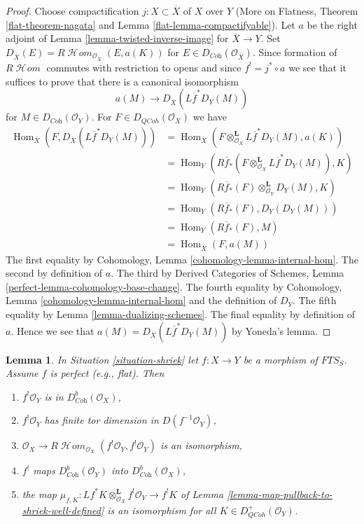 \documentclass{stacks-project}
\theoremstyle{plain}
\newtheorem{lemma}[subsection]{Lemma}
\theoremstyle{definition}
\theoremstyle{remark}
\numberwithin{equation}{subsection}
\def\Hom{\mathop{\mathrm{Hom}}\nolimits}
\def\SheafHom{\mathop{\mathcal{H}\!\mathit{om}}\nolimits}
\def\QCoh{\mathit{QCoh}}
\begin{document}
\begin{proof}
Choose compactification $j : X \subset \overline{X}$ of $X$ over $Y$
(More on Flatness, Theorem \ref{flat-theorem-nagata} and
Lemma \ref{flat-lemma-compactifyable}). Let $a$ be the
right adjoint of Lemma \ref{lemma-twisted-inverse-image} for
$\overline{X} \to Y$. Set
$D_{\overline{X}}(E) = R\SheafHom_{\mathcal{O}_{\overline{X}}}(E, a(K))$
for $E \in D_{\textit{Coh}}(\mathcal{O}_{\overline{X}})$.
Since formation of $R\SheafHom$ commutes with restriction to opens
and since $f^! = j^* \circ a$ we see that it suffices to prove that
there is a canonical isomorphism
$$
a(M) \longrightarrow D_{\overline{X}}(L\overline{f}^*D_Y(M))
$$
for $M \in D_{\textit{Coh}}(\mathcal{O}_Y)$. For
$F \in D_\QCoh(\mathcal{O}_X)$ we have
\begin{align*}
\Hom_{\overline{X}}(
F, D_{\overline{X}}(L\overline{f}^*D_Y(M)))
& =
\Hom_{\overline{X}}(
F \otimes_{\mathcal{O}_X}^\mathbf{L} L\overline{f}^*D_Y(M), a(K)) \\
& =
\Hom_Y(
R\overline{f}_*(F \otimes_{\mathcal{O}_X}^\mathbf{L} L\overline{f}^*D_Y(M)),
K) \\
& =
\Hom_Y(
R\overline{f}_*(F) \otimes_{\mathcal{O}_Y}^\mathbf{L} D_Y(M),
K) \\
& =
\Hom_Y(
R\overline{f}_*(F), D_Y(D_Y(M))) \\
& =
\Hom_Y(R\overline{f}_*(F), M) \\
& = \Hom_{\overline{X}}(F, a(M))
\end{align*}
The first equality by Cohomology, Lemma \ref{cohomology-lemma-internal-hom}.
The second by definition of $a$.
The third by Derived Categories of Schemes, Lemma
\ref{perfect-lemma-cohomology-base-change}.
The fourth equality by Cohomology, Lemma \ref{cohomology-lemma-internal-hom}
and the definition of $D_Y$.
The fifth equality by Lemma \ref{lemma-dualizing-schemes}.
The final equality by definition of $a$.
Hence we see that $a(M) = D_{\overline{X}}(L\overline{f}^*D_Y(M))$
by Yoneda's lemma.
\end{proof}

\begin{lemma}
\label{lemma-perfect-comparison-shriek}
In Situation \ref{situation-shriek} let $f : X \to Y$ be a morphism of
$\textit{FTS}_S$. Assume $f$ is perfect (e.g., flat). Then
\begin{enumerate}
\item[(a)] $f^!\mathcal{O}_Y$ is in $D_{\textit{Coh}}^b(\mathcal{O}_X)$,
\item[(b)] $f^!\mathcal{O}_Y$ has finite tor dimension in
$D(f^{-1}\mathcal{O}_Y)$,
\item[(c)] $\mathcal{O}_X \to
R\SheafHom_{\mathcal{O}_X}(f^!\mathcal{O}_Y, f^!\mathcal{O}_Y)$
is an isomorphism,
\item[(d)] $f^!$ maps $D_{\textit{Coh}}^b(\mathcal{O}_Y)$ into
$D_{\textit{Coh}}^b(\mathcal{O}_X)$,
\item[(e)] the map
$\mu_{f,  K} :
Lf^*K \otimes_{\mathcal{O}_X}^\mathbf{L} f^!\mathcal{O}_Y
\to
f^!K$
of Lemma \ref{lemma-map-pullback-to-shriek-well-defined}
is an isomorphism for all $K \in D_\QCoh^+(\mathcal{O}_Y)$.
\end{enumerate}
\end{lemma}
\end{document}
